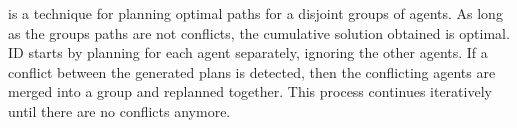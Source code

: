 \documentclass[letterpaper]{article} %
\def\
UrlFont{\rm}  %
\theoremstyle{definition}
\begin{document}
 \cite{standley2010finding} is a technique for planning optimal paths for a disjoint groups of agents. As long as the groups paths are not conflicts, the cumulative solution obtained is optimal. ID starts by planning for each agent separately, ignoring the other agents. If a conflict between the generated plans is detected, then the conflicting agents are merged into a group and replanned together. This process continues iteratively until there are no conflicts anymore.
\end{document}
